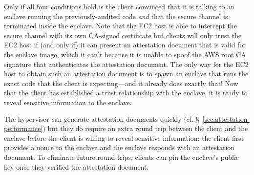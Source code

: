 Only if all four conditions hold is the client convinced that it is talking to
an enclave running the previously-audited code \emph{and} that the secure
channel is terminated inside the enclave.  Note that the EC2 host is able to
intercept the secure channel with its own CA-signed certificate but clients will
only trust the EC2 host if (and only if) it can present an attestation document
that is valid for the enclave image, which it can't because it is unable to
spoof the AWS root CA signature that authenticates the attestation document.
The only way for the EC2 host to obtain such an attestation document is to spawn
an enclave that runs the exact code that the client is expecting---and it
already does exactly that!  Now that the client has established a trust
relationship with the enclave, it is ready to reveal sensitive information to
the enclave.

The hypervisor can generate attestation documents quickly (cf.
\S~\ref{sec:attestation-performance}) but they do require an extra round trip
between the client and the enclave before the client is willing to reveal
sensitive information: the client first provides a nonce to the enclave and the
enclave responds with an attestation document.  To eliminate future round trips,
clients can pin the enclave's public key once they verified the attestation
document.

% 
% 
% 

